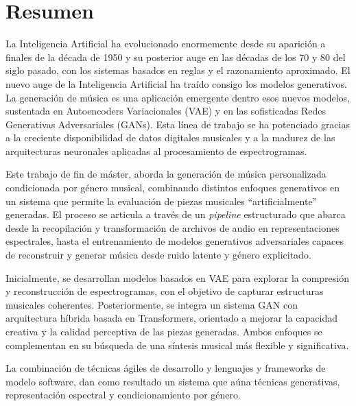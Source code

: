 \cleardoublepage

\chapter*{Resumen}
\label{resumen}

La Inteligencia Artificial ha evolucionado enormemente desde su aparición a finales de la década de 1950 y su posterior auge en las décadas de los 70 y 80 del siglo pasado, con los sistemas basados en reglas y el razonamiento aproximado. El nuevo auge de la Inteligencia Artificial ha traído consigo los modelos generativos. La generación de música es una aplicación emergente dentro esos nuevos modelos, sustentada en Autoencoders Variacionales (VAE) y en las sofisticadas Redes Generativas Adversariales (GANs). Esta línea de trabajo se ha potenciado gracias a la creciente disponibilidad de datos digitales musicales y a la madurez de las arquitecturas neuronales aplicadas al procesamiento de espectrogramas.

Este trabajo de fin de máster, aborda la generación de música personalizada condicionada por género musical, combinando distintos enfoques generativos en un sistema que permite la evaluación de piezas musicales ``artificialmente'' generadas. El proceso se articula a través de un \textit{pipeline} estructurado que abarca desde la recopilación y transformación de archivos de audio en representaciones espectrales, hasta el entrenamiento de modelos generativos adversariales capaces de reconstruir y generar música desde ruido latente y género explicitado.

Inicialmente, se desarrollan modelos basados en VAE para explorar la compresión y reconstrucción de espectrogramas, con el objetivo de capturar estructuras musicales coherentes. Posteriormente, se integra un sistema GAN con arquitectura híbrida basada en Transformers, orientado a mejorar la capacidad creativa y la calidad perceptiva de las piezas generadas. Ambos enfoques se complementan en su búsqueda de una síntesis musical más flexible y significativa.

La combinación de técnicas ágiles de desarrollo y lenguajes y frameworks de modelo software, dan como resultado un sistema que aúna técnicas generativas, representación espectral y condicionamiento por género.